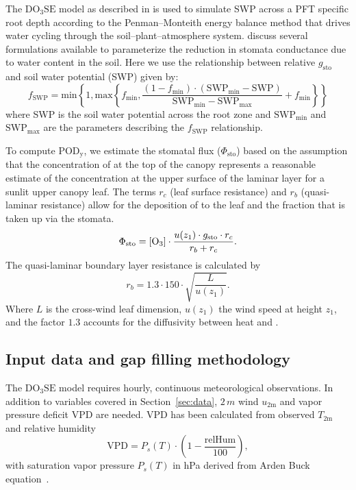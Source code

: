 \documentclass[bg, manuscript]{copernicus}
\begin{document}
The $\mathrm{DO_3SE}$ model as described in \citet{ACP:Bueker2012} is used to simulate SWP across a PFT specific root depth according to the Penman--Monteith energy balance method that drives water cycling through the soil--plant--atmosphere system. \citet{ACP:Bueker2012} discuss several formulations available to parameterize the reduction in stomata conductance due to water content in the soil. Here we use the relationship between relative $g_\mathrm{sto}$ and soil water potential (SWP) given by:
%
\begin{equation}
  f_\mathrm{SWP} = \text{min}\left\{1, \text{max}\left\{f_\mathrm{min}, \frac{(1 - f_\mathrm{min})\cdot(\mathrm{SWP_{min}} - \mathrm{SWP})}{\mathrm{SWP_{min}} - \mathrm{SWP_{max}}} + f_\mathrm{min} \right\} \right\}
    \label{eq:fsw}
\end{equation}
%
where SWP is the soil water potential across the root zone and $\mathrm{SWP_{min}}$ and $\mathrm{SWP_{max}}$ are the parameters describing the $f_\mathrm{SWP}$ relationship.

To compute $\mathrm{POD_y}$, we estimate the stomatal  flux ($\Phi_\mathrm{sto}$) based on the assumption that the concentration of  at the top of the canopy represents a reasonable estimate of the concentration at the upper surface of the laminar layer for a sunlit upper canopy leaf. The terms $r_c$ (leaf surface resistance) and $r_b$ (quasi-laminar resistance) allow for the deposition of  to the leaf and the fraction that is taken up via the stomata. 
%
\begin{equation}
  \Phi_\mathrm{sto} = \chem{[O_3]} \cdot \frac{u(z_1) \cdot g_\mathrm{sto} \cdot r_c}{r_b + r_c}.
  \label{eq:flux_stomata}
\end{equation}
%
The quasi-laminar boundary layer resistance is calculated by
%
\begin{equation}
  r_b = 1.3 \cdot 150 \cdot \sqrt{\frac{L}{u(z_1)}}.
  \label{eq:quasi_laminar_resist}
\end{equation}
%
Where $L$ is the cross-wind leaf dimension, $u(z_1)$ the wind speed at height $z_1$, and the factor $1.3$ accounts for the diffusivity between heat and . 

\subsection{Input data and gap filling methodology}
\label{subsec:ozone_reco}
The $\mathrm{DO_3SE}$ model requires hourly, continuous meteorological observations. In addition to variables covered in Section~\ref{sec:data}, $2\,\unit{m}$ wind $u_\text{2m}$ and vapor pressure deficit VPD are needed. VPD has been calculated from observed $T_\text{2m}$ and relative humidity
\begin{equation}
  \text{VPD} = P_s(T) \cdot \left(1-\frac{\text{relHum}}{100}\right),
\end{equation}
with saturation vapor pressure $P_s(T)$ in \unit{hPa} derived from Arden Buck equation~\citep{JAP:Buck1981, Buck2012}.
  
\end{document}
